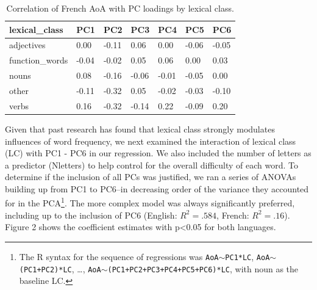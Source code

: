 \documentclass[10pt, letterpaper]{article}
\newenvironment{CodeChunk}{}{}
\begin{document}
\begin{CodeChunk}



\begin{table}[h]

\begin{center}
\begin{threeparttable}

\caption{\label{tab:unnamed-chunk-5}Correlation of French AoA with PC loadings by lexical class.}

\begin{tabular}{lllllll}
\toprule
lexical\_class & \multicolumn{1}{c}{PC1} & \multicolumn{1}{c}{PC2} & \multicolumn{1}{c}{PC3} & \multicolumn{1}{c}{PC4} & \multicolumn{1}{c}{PC5} & \multicolumn{1}{c}{PC6}\\
\midrule
adjectives & 0.00 & -0.11 & 0.06 & 0.00 & -0.06 & -0.05\\
function\_words & -0.04 & -0.02 & 0.05 & 0.06 & 0.00 & 0.03\\
nouns & 0.08 & -0.16 & -0.06 & -0.01 & -0.05 & 0.00\\
other & -0.11 & -0.32 & 0.05 & -0.02 & -0.03 & -0.10\\
verbs & 0.16 & -0.32 & -0.14 & 0.22 & -0.09 & 0.20\\
\bottomrule
\end{tabular}

\end{threeparttable}
\end{center}

\end{table}


\end{CodeChunk}

Given that past research has found that lexical class strongly modulates
influences of word frequency, we next examined the interaction of
lexical class (LC) with PC1 - PC6 in our regression. We also included
the number of letters as a predictor (Nletters) to help control for the
overall difficulty of each word. To determine if the inclusion of all
PCs was justified, we ran a series of ANOVAs building up from PC1 to
PC6--in decreasing order of the variance they accounted for in the
PCA\footnote{The R syntax for the sequence of regressions was
  \texttt{AoA}\(\sim\)\texttt{PC1*LC},
  \texttt{AoA}\(\sim\)\texttt{(PC1+PC2)*LC}, \ldots,
  \texttt{AoA}\(\sim\)\texttt{(PC1+PC2+PC3+PC4+PC5+PC6)*LC}, with noun
  as the baseline LC.}. The more complex model was always significantly
preferred, including up to the inclusion of PC6 (English:
\(R^2 = .584\), French: \(R^2 = .16\)). Figure 2 shows the coefficient
estimates with p\textless0.05 for both languages.
\end{document}
